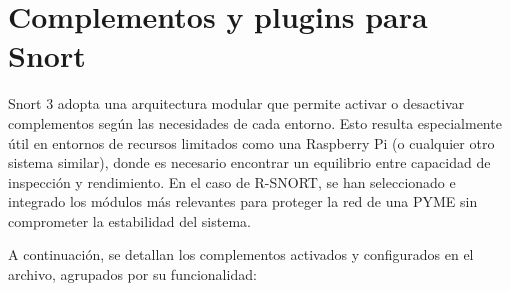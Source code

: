 \documentclass[11pt,a4paper,twoside]{report}
\begin{document}
\section{Complementos y plugins para Snort}

Snort 3 adopta una arquitectura modular que permite activar o desactivar complementos según las necesidades de cada entorno. Esto resulta especialmente útil en entornos de recursos limitados como una Raspberry Pi (o cualquier otro sistema similar), donde es necesario encontrar un equilibrio entre capacidad de inspección y rendimiento. En el caso de R-SNORT, se han seleccionado e integrado los módulos más relevantes para proteger la red de una PYME sin comprometer la estabilidad del sistema.\newline

A continuación, se detallan los complementos activados y configurados en el archivo, agrupados por su funcionalidad:
\end{document}
